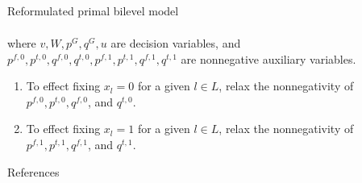 \documentclass[xcolor=dvipsnames]{beamer}
\begin{document}
\begin{frame}{Reformulated primal bilevel model}
\begin{tiny}
\begin{subequations}
\begin{align}
\end{align}
\end{subequations}
where $v,W,p^G,q^G,u$ are decision variables, and $p^{f,0},p^{t,0},q^{f,0},q^{t,0},p^{f,1},p^{t,1},q^{f,1},q^{t,1}$ are nonnegative auxiliary variables. 
\begin{enumerate}
\item To effect fixing $x_l=0$ for a given $l \in L$, relax the nonnegativity of $p^{f,0},p^{t,0},q^{f,0}$, and $q^{t,0}$.
\item To effect fixing $x_l=1$ for a given $l \in L$, relax the nonnegativity of $p^{f,1},p^{t,1},q^{f,1}$, and $q^{t,1}$.
\end{enumerate}
\end{tiny}
\end{frame}



 


\begin{frame}[allowframebreaks]{References} 

 
%



\end{frame}
      
\end{document}
